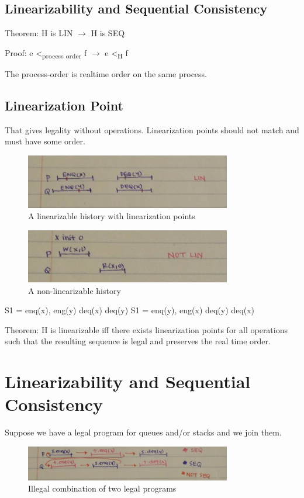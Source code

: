 \documentclass[twoside]{article}
\begin{document}
\subsection{Linearizability and Sequential Consistency}

Theorem: H is LIN $\rightarrow$ H is SEQ

Proof: 
e \textless\textsubscript{process order} f $\rightarrow$  e \textless\textsubscript{H} f

The process-order is realtime order on the same process.

\subsection{Linearization Point}

That gives legality without operations. Linearization points should not match and must have some order.
\begin{figure}[ht!]
\centering
\includegraphics[width=90mm]{pic_10.jpg}
\caption{A linearizable history with linearization points\label{overflow}}
\end{figure}
\begin{figure}[ht!]
\centering
\includegraphics[width=90mm]{pic_9.jpg}
\caption{A non-linearizable history\label{overflow}}
\end{figure}
S1 = enq(x), eng(y) deq(x) deq(y)
S1 = enq(y), eng(x) deq(y) deq(x)

Theorem:
H is linearizable iff there exists linearization points for all operations such that the resulting sequence is legal and preserves the real time order.


\section{Linearizability and Sequential Consistency}

Suppose we have a legal program for queues and/or stacks and we join them.
\begin{figure}[ht!]
\centering
\includegraphics[width=90mm]{pic_11.jpg}
\caption{Illegal combination of two legal programs \label{overflow}}
\end{figure}
\end{document}
